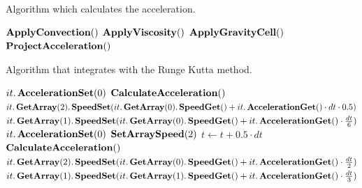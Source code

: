 \begin{algorithm}
\caption{Algorithm which calculates the acceleration.}
\label{code:CalculateAcceleration}
\begin{algorithmic}[1]
   {}
	\State $\mathop{\textbf{ApplyConvection}}()$
	\State $\mathop{\textbf{ApplyViscosity}}()$
	\State $\mathop{\textbf{ApplyGravityCell}}()$
	\State $\mathop{\textbf{ProjectAcceleration}}()$
	\EndProcedure
 \end{algorithmic}
\end{algorithm}

\begin{algorithm}
\caption{Algorithm that integrates with the Runge Kutta method.}
\label{code:RungeKutta}
\begin{algorithmic}[1]
            \State $it.\mathop{\textbf{AccelerationSet}}(0)$
\EndFor
	\State $\mathop{\textbf{CalculateAcceleration}}()$
            \State $it.\mathop{\textbf{GetArray}}(2).\mathop{\textbf{SpeedSet}}(it.\mathop{\textbf{GetArray}}(0).\mathop{\textbf{SpeedGet}}()+it.\mathop{\textbf{AccelerationGet}}()\cdot dt \cdot 0.5)$
            \State $it.\mathop{\textbf{GetArray}}(1).\mathop{\textbf{SpeedSet}}(it.\mathop{\textbf{GetArray}}(0).\mathop{\textbf{SpeedGet}}()+it.\mathop{\textbf{AccelerationGet}}()\cdot \frac{dt}{6})$
        \EndFor
            \State $it.\mathop{\textbf{AccelerationSet}}(0)$
        \EndFor
        \State $\mathop{\textbf{SetArraySpeed}}(2)$
        \State $t\gets t+0.5\cdot dt$
        \State $\mathop{\textbf{CalculateAcceleration}}()$
            \State $it.\mathop{\textbf{GetArray}}(2).\mathop{\textbf{SpeedSet}}(it.\mathop{\textbf{GetArray}}(0).\mathop{\textbf{SpeedGet}}()+it.\mathop{\textbf{AccelerationGet}}()\cdot \frac{dt}{2})$
            \State $it.\mathop{\textbf{GetArray}}(1).\mathop{\textbf{SpeedSet}}(it.\mathop{\textbf{GetArray}}(1).\mathop{\textbf{SpeedGet}}()+it.\mathop{\textbf{AccelerationGet}}()\cdot \frac{dt}{3})$
       \EndFor

\end{algorithmic}
\end{algorithm}
